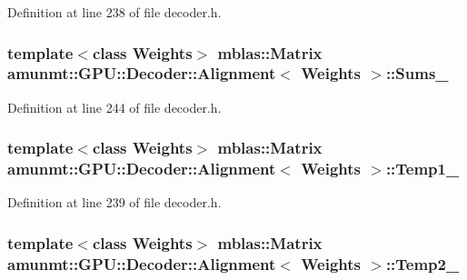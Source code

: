 Definition at line 238 of file decoder.\+h.

\subsubsection[{\texorpdfstring{Sums\+\_\+}{Sums_}}]{\setlength{\rightskip}{0pt plus 5cm}template$<$class Weights$>$ {\bf mblas\+::\+Matrix} {\bf amunmt\+::\+G\+P\+U\+::\+Decoder\+::\+Alignment}$<$ {\bf Weights} $>$\+::Sums\+\_\+\hspace{0.3cm}{\ttfamily [private]}}\hypertarget{classamunmt_1_1GPU_1_1Decoder_1_1Alignment_ada54a344803a2df414eea80f596a568d}{}\label{classamunmt_1_1GPU_1_1Decoder_1_1Alignment_ada54a344803a2df414eea80f596a568d}


Definition at line 244 of file decoder.\+h.

\subsubsection[{\texorpdfstring{Temp1\+\_\+}{Temp1_}}]{\setlength{\rightskip}{0pt plus 5cm}template$<$class Weights$>$ {\bf mblas\+::\+Matrix} {\bf amunmt\+::\+G\+P\+U\+::\+Decoder\+::\+Alignment}$<$ {\bf Weights} $>$\+::Temp1\+\_\+\hspace{0.3cm}{\ttfamily [private]}}\hypertarget{classamunmt_1_1GPU_1_1Decoder_1_1Alignment_ab9dd63a8ff8558c4be5a1edb595444a9}{}\label{classamunmt_1_1GPU_1_1Decoder_1_1Alignment_ab9dd63a8ff8558c4be5a1edb595444a9}


Definition at line 239 of file decoder.\+h.

\subsubsection[{\texorpdfstring{Temp2\+\_\+}{Temp2_}}]{\setlength{\rightskip}{0pt plus 5cm}template$<$class Weights$>$ {\bf mblas\+::\+Matrix} {\bf amunmt\+::\+G\+P\+U\+::\+Decoder\+::\+Alignment}$<$ {\bf Weights} $>$\+::Temp2\+\_\+\hspace{0.3cm}{\ttfamily [private]}}\hypertarget{classamunmt_1_1GPU_1_1Decoder_1_1Alignment_a436ddfe4e64a8f9d2e088c62743d4e30}{}\label{classamunmt_1_1GPU_1_1Decoder_1_1Alignment_a436ddfe4e64a8f9d2e088c62743d4e30}


